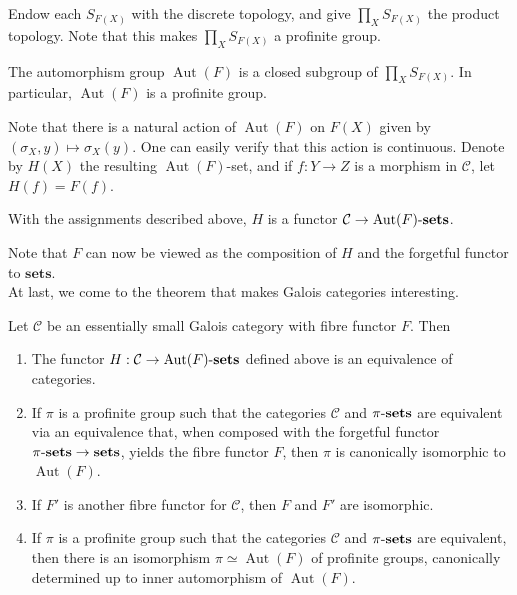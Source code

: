 \documentclass[11pt,openany]{book} %
\newcommand{\Aut}{\operatorname{Aut}}
\newcommand{\xsets}[1]{#1\textnormal{-}\mathbf{sets}}
\begin{document}
Endow each $S_{F(X)}$ with the discrete topology, and give $\prod_X S_{F(X)}$ the product topology. Note that this makes $\prod_X S_{F(X)}$ a profinite group.\\

\begin{lemma}
The automorphism group $\Aut(F)$ is a closed subgroup of $\prod_X S_{F(X)}$. In particular, $\Aut(F)$ is a profinite group.
\end{lemma}
\medskip

Note that there is a natural action of $\Aut(F)$ on $F(X)$ given by $(\sigma_X, y) \mapsto \sigma_X(y)$. One can easily verify that this action is continuous. Denote by $H(X)$ the resulting $\Aut(F)$-set, and if $f : Y \to Z$ is a morphism in $\mathcal{C}$, let $H(f) = F(f)$.\\

\begin{lemma}
With the assignments described above, $H$ is a functor $\mathcal{C} \to \xsets{\Aut(F)}$.
\end{lemma}
\medskip

Note that $F$ can now be viewed as the composition of $H$ and the forgetful functor to $\mathbf{sets}$.\\

At last, we come to the theorem that makes Galois categories interesting.

\begin{theorem} \label{galoiscat}
Let $\mathcal{C}$ be an essentially small Galois category with fibre functor $F$. Then
\begin{enumerate}[label=(\alph*)]
	\item The functor $H : \mathcal{C} \to \xsets{\Aut(F)}$ defined above is an equivalence of categories.
    \item If $\pi$ is a profinite group such that the categories $\mathcal{C}$ and $\xsets{\pi}$ are equivalent via an equivalence that, when composed with the forgetful functor $\xsets{\pi} \to \mathbf{sets}$, yields the fibre functor $F$, then $\pi$ is canonically isomorphic to $\Aut(F)$.
    \item If $F'$ is another fibre functor for $\mathcal{C}$, then $F$ and $F'$ are isomorphic.
    \item If $\pi$ is a profinite group such that the categories $\mathcal{C}$ and $\xsets{\pi}$ are equivalent, then there is an isomorphism $\pi \simeq \Aut(F)$ of profinite groups, canonically determined up to inner automorphism of $\Aut(F)$.
\end{enumerate}
\end{theorem}
\end{document}
